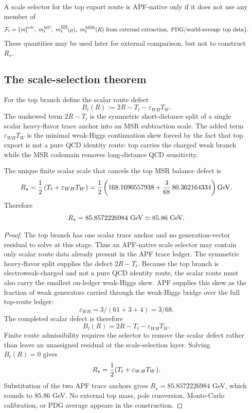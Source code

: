 \begin{definition}
A scale selector for the top export route is APF-native only if it does not use any member of
\[
        \mathcal F_t=
        \{m_t^{\rm pole},\ m_t^{\rm MC},\ m_t^{\overline{\rm MS}}(\mu),\
        m_t^{\rm MSR}(R)\hbox{ from external extraction},\hbox{ PDG/world-average top data}\}.
\]
These quantities may be used later for external comparison, but not to construct \(R_\star\).
\end{definition}

\subsection{The scale-selection theorem}

\begin{definition}
For the top branch define the scalar route defect
\[
        B_t(R):=2R-T_t-\varepsilon_{WH}T_W.
\]
The unskewed term \(2R-T_t\) is the symmetric short-distance split of a single scalar heavy-flavor trace anchor into an MSR subtraction scale.  The added term \(\varepsilon_{WH}T_W\) is the minimal weak-Higgs continuation skew forced by the fact that top export is not a pure QCD identity route: top carries the charged weak branch while the MSR codomain removes long-distance QCD sensitivity.
\end{definition}

\begin{theorem}
\label{thm:top-msr-scale-selector-v37}
The unique finite scalar scale that cancels the top MSR balance defect is
\[
        R_\star
        ={1\over2}\left(T_t+\varepsilon_{WH}T_W\right)
        ={1\over2}\left(
        168.1690557938+{3\over68}\,80.362164334
        \right){\rm GeV}.
\]
Therefore
\[
        R_\star=85.8572226984\ {\rm GeV}
        \simeq 85.86\ {\rm GeV}.
\]
\end{theorem}

\begin{proof}
The top branch has one scalar trace anchor and no generation-vector residual to solve at this stage.  Thus an APF-native scale selector may contain only scalar route data already present in the APF trace ledger.  The symmetric heavy-flavor split supplies the defect \(2R-T_t\).  Because the top branch is electroweak-charged and not a pure QCD identity route, the scalar route must also carry the smallest on-ledger weak-Higgs skew.  APF supplies this skew as the fraction of weak generators carried through the weak-Higgs bridge over the full top-route ledger:
\[
        \varepsilon_{WH}=3/(61+3+4)=3/68.
\]
The completed scalar defect is therefore
\[
        B_t(R)=2R-T_t-\varepsilon_{WH}T_W.
\]
Finite route admissibility requires the selector to remove the scalar defect rather than leave an unassigned residual at the scale-selection layer.  Solving \(B_t(R)=0\) gives
\[
        R_\star={1\over2}(T_t+\varepsilon_{WH}T_W).
\]
Substitution of the two APF trace anchors gives \(R_\star=85.8572226984\) GeV, which rounds to \(85.86\) GeV.  No external top mass, pole conversion, Monte-Carlo calibration, or PDG average appears in the construction.  \qedhere
\end{proof}

